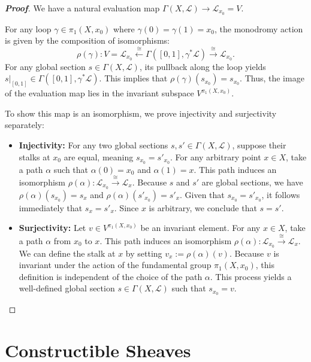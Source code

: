 \begin{proof}[\textbf{Proof}]
We have a natural evaluation map $\Gamma(X, \mathcal{L}) \rightarrow \mathcal{L}_{x_0} = V$.

For any loop $\gamma \in \pi_1(X, x_0)$ where $\gamma(0) = \gamma(1) = x_0$, the monodromy action is given by the composition of isomorphisms:
\[ \rho(\gamma): V = \mathcal{L}_{x_0} \xleftarrow{\cong} \Gamma([0,1], \gamma^*\mathcal{L}) \xrightarrow{\cong} \mathcal{L}_{x_0}. \]
For any global section $s \in \Gamma(X, \mathcal{L})$, its pullback along the loop yields $s|_{[0,1]} \in \Gamma([0,1], \gamma^*\mathcal{L})$. This implies that $\rho(\gamma)(s_{x_0}) = s_{x_0}$. Thus, the image of the evaluation map lies in the invariant subspace $V^{\pi_1(X, x_0)}$.

To show this map is an isomorphism, we prove injectivity and surjectivity separately:

\begin{itemize}
    \item \textbf{Injectivity:} For any two global sections $s, s' \in \Gamma(X, \mathcal{L})$, suppose their stalks at $x_0$ are equal, meaning $s_{x_0} = s'_{x_0}$. For any arbitrary point $x \in X$, take a path $\alpha$ such that $\alpha(0) = x_0$ and $\alpha(1) = x$. This path induces an isomorphism $\rho(\alpha): \mathcal{L}_{x_0} \xrightarrow{\cong} \mathcal{L}_x$. Because $s$ and $s'$ are global sections, we have $\rho(\alpha)(s_{x_0}) = s_x$ and $\rho(\alpha)(s'_{x_0}) = s'_x$. Given that $s_{x_0} = s'_{x_0}$, it follows immediately that $s_x = s'_x$. Since $x$ is arbitrary, we conclude that $s = s'$.
    
    \item \textbf{Surjectivity:} Let $v \in V^{\pi_1(X, x_0)}$ be an invariant element. For any $x \in X$, take a path $\alpha$ from $x_0$ to $x$. This path induces an isomorphism $\rho(\alpha): \mathcal{L}_{x_0} \xrightarrow{\cong} \mathcal{L}_x$. We can define the stalk at $x$ by setting $v_x := \rho(\alpha)(v)$. Because $v$ is invariant under the action of the fundamental group $\pi_1(X, x_0)$, this definition is independent of the choice of the path $\alpha$. This process yields a well-defined global section $s \in \Gamma(X, \mathcal{L})$ such that $s_{x_0} = v$.
\end{itemize}
\end{proof}

\section{Constructible Sheaves}

